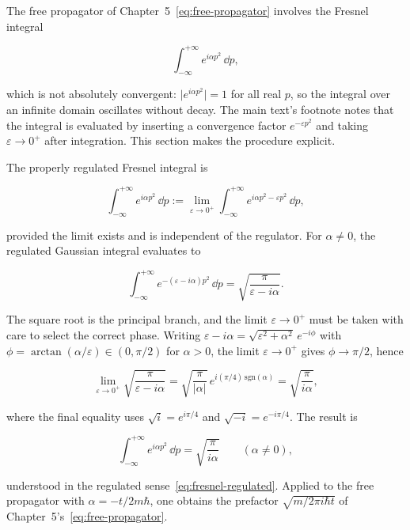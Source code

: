 The free propagator of Chapter~5~\eqref{eq:free-propagator} involves the Fresnel integral
\begin{linenomath}
    \begin{equation}
        \int_{-\infty}^{+\infty} e^{i\alpha p^2}\,\dd p,
        \label{eq:fresnel-raw}
    \end{equation}
\end{linenomath}
which is not absolutely convergent: $\lvert e^{i\alpha p^2}\rvert = 1$ for all real $p$, so the integral over an infinite domain oscillates without decay. The main text's footnote notes that the integral is evaluated by inserting a convergence factor $e^{-\varepsilon p^2}$ and taking $\varepsilon \to 0^+$ after integration. This section makes the procedure explicit.

The properly regulated Fresnel integral is
\begin{linenomath}
    \begin{equation}
        \int_{-\infty}^{+\infty} e^{i\alpha p^2}\,\dd p := \lim_{\varepsilon \to 0^+} \int_{-\infty}^{+\infty} e^{i\alpha p^2 - \varepsilon p^2}\,\dd p,
        \label{eq:fresnel-regulated}
    \end{equation}
\end{linenomath}
provided the limit exists and is independent of the regulator. For $\alpha \neq 0$, the regulated Gaussian integral evaluates to
\begin{linenomath}
    \begin{equation}
        \int_{-\infty}^{+\infty} e^{-(\varepsilon - i\alpha)p^2}\,\dd p = \sqrt{\frac{\pi}{\varepsilon - i\alpha}}.
        \label{eq:fresnel-gaussian}
    \end{equation}
\end{linenomath}
The square root is the principal branch, and the limit $\varepsilon \to 0^+$ must be taken with care to select the correct phase. Writing $\varepsilon - i\alpha = \sqrt{\varepsilon^2 + \alpha^2}\,e^{-i\phi}$ with $\phi = \arctan(\alpha/\varepsilon) \in (0,\pi/2)$ for $\alpha > 0$, the limit $\varepsilon \to 0^+$ gives $\phi \to \pi/2$, hence
\begin{linenomath}
    \begin{equation}
        \lim_{\varepsilon \to 0^+} \sqrt{\frac{\pi}{\varepsilon - i\alpha}} = \sqrt{\frac{\pi}{\lvert\alpha\rvert}}\,e^{i(\pi/4)\,\mathrm{sgn}(\alpha)} = \sqrt{\frac{\pi}{i\alpha}},
        \label{eq:fresnel-limit}
    \end{equation}
\end{linenomath}
where the final equality uses $\sqrt{i} = e^{i\pi/4}$ and $\sqrt{-i} = e^{-i\pi/4}$. The result is
\begin{linenomath}
    \begin{equation}
        \int_{-\infty}^{+\infty} e^{i\alpha p^2}\,\dd p = \sqrt{\frac{\pi}{i\alpha}} \qquad (\alpha \neq 0),
        \label{eq:fresnel-result}
    \end{equation}
\end{linenomath}
understood in the regulated sense~\eqref{eq:fresnel-regulated}. Applied to the free propagator with $\alpha = -t/2m\hbar$, one obtains the prefactor $\sqrt{m/2\pi i\hbar t}$ of Chapter~5's~\eqref{eq:free-propagator}.

